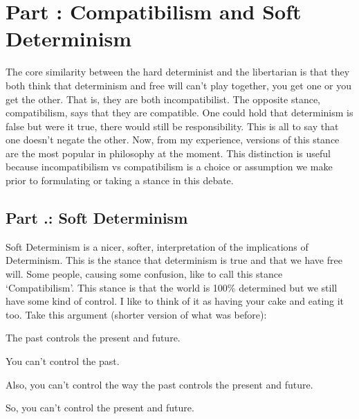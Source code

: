 \chapter{Part \thechapcount: Compatibilism and Soft Determinism}\setcounter{seccount}{1}
The core similarity between the hard determinist and the libertarian is that they both think that determinism and free will can’t play together, you get one or you get the other. That is, they are both incompatibilist. The opposite stance, compatibilism, says that they are compatible. One could hold that determinism is false but were it true, there would still be responsibility. This is all to say that one doesn't negate the other. Now, from my experience, versions of this stance are the most popular in philosophy at the moment. This distinction is useful because incompatibilism vs compatibilism is a choice or assumption we make prior to formulating or taking a stance in this debate. 

\section{Part \thechapcount.\theseccount:  Soft Determinism}

Soft Determinism is a nicer, softer, interpretation of the implications of Determinism. This is the stance that determinism is true and that we have free will. Some people, causing some confusion, like to call this stance `Compatibilism'. This stance is that the world is 100\% determined but we still have some kind of control. I like to think of it as having your cake and eating it too. Take this argument (shorter version of what was before):

\begin{earg}
    \item[]The past controls the present and future.
    \item[]You can't control the past.
    \item[]Also, you can't control the way the past controls the present and future.
    \item[]So, you can't control the present and future.
\end{earg}

